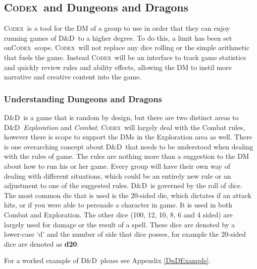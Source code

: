 \documentclass[review]{cmpreport}
\newcommand{\dnd}{D\&D}
\newcommand{\Codex}{\textsc{Codex}}
\begin{document}
	\subsection{\Codex \ and Dungeons and Dragons} \label{DnDRules&Lit}
	\Codex \ is a tool for the DM of a group to use in order that they can enjoy running games of \dnd \ to a higher degree. To do this, a limit has been set on\Codex \ scope. \Codex \ will not replace any dice rolling or the simple arithmetic that fuels the game. Instead \Codex \ will be an interface to track game statistics and quickly review rules and ability effects,  allowing the DM to instil more narrative and creative content into the game.
	
	\subsubsection{Understanding Dungeons and Dragons}
	\dnd \ is a game that is random by design, but there are two distinct areas to \dnd \, \emph{Exploration} and \emph{Combat}. \Codex \ will largely deal with the Combat rules, however there is scope to support the DMs in the Exploration area as well. There is one overarching concept about \dnd \ that needs to be understood when dealing with the rules of game. The rules are nothing more than a suggestion to the DM about how to run his or her game. Every group will have their own way of dealing with different situations, which could be an entirely new rule or an adjustment to one of the suggested rules. \dnd \ is governed by the roll of dice. The most common die that is used is the 20-sided die, which dictates if an attack hits, or if you were able to persuade a character in game. It is used in both Combat and Exploration. The other dice (100, 12, 10, 8, 6 and 4 sided) are largely used for damage or the result of a spell. These dice are denoted by a lower-case `d' and the number of side that dice posses, for example the 20-sided dice are denoted as \textbf{d20}.
	
	For a worked example of \dnd \ please see Appendix \ref{DnDExample}.
	
\end{document}
